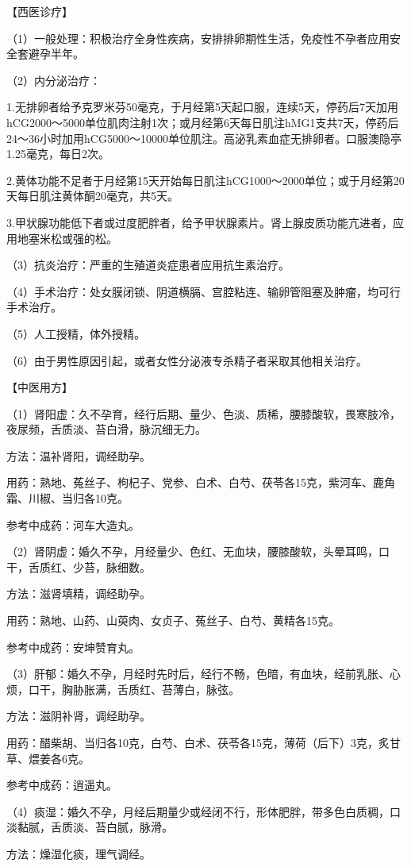\documentclass[12pt,UTF8,openany]{ctexbook}
\begin{document}
【西医诊疗】

（1）一般处理：积极治疗全身性疾病，安排排卵期性生活，免疫性不孕者应用安全套避孕半年。

（2）内分泌治疗：

1.无排卵者给予克罗米芬50毫克，于月经第5天起口服，连续5天，停药后7天加用hCG2000～5000单位肌肉注射1次；或月经第6天每日肌注hMG1支共7天，停药后24～36小时加用hCG5000～10000单位肌注。高泌乳素血症无排卵者。口服澳隐亭1.25毫克，每日2次。

2.黄体功能不足者于月经第15天开始每日肌注hCG1000～2000单位；或于月经第20天每日肌注黄体酮20毫克，共5天。

3.甲状腺功能低下者或过度肥胖者，给予甲状腺素片。肾上腺皮质功能亢进者，应用地塞米松或强的松。

（3）抗炎治疗：严重的生殖道炎症患者应用抗生素治疗。

（4）手术治疗：处女膜闭锁、阴道横膈、宫腔粘连、输卵管阻塞及肿瘤，均可行手术治疗。

（5）人工授精，体外授精。

（6）由于男性原因引起，或者女性分泌液专杀精子者采取其他相关治疗。

【中医用方】

（1）肾阳虚：久不孕育，经行后期、量少、色淡、质稀，腰膝酸软，畏寒肢冷，夜尿频，舌质淡、苔白滑，脉沉细无力。

方法：温补肾阳，调经助孕。

用药：熟地、菟丝子、枸杞子、党参、白术、白芍、茯苓各15克，紫河车、鹿角霜、川椒、当归各10克。

参考中成药：河车大造丸。

（2）肾阴虚：婚久不孕，月经量少、色红、无血块，腰膝酸软，头晕耳鸣，口干，舌质红、少苔，脉细数。

方法：滋肾填精，调经助孕。

用药：熟地、山药、山萸肉、女贞子、菟丝子、白芍、黄精各15克。

参考中成药：安坤赞育丸。

（3）肝郁：婚久不孕，月经时先时后，经行不畅，色暗，有血块，经前乳胀、心烦，口干，胸胁胀满，舌质红、苔薄白，脉弦。

方法：滋阴补肾，调经助孕。

用药：醋柴胡、当归各10克，白芍、白术、茯苓各15克，薄荷（后下）3克，炙甘草、煨姜各6克。

参考中成药：逍遥丸。

（4）痰湿：婚久不孕，月经后期量少或经闭不行，形体肥胖，带多色白质稠，口淡黏腻，舌质淡、苔白腻，脉滑。

方法：燥湿化痰，理气调经。
\end{document}
